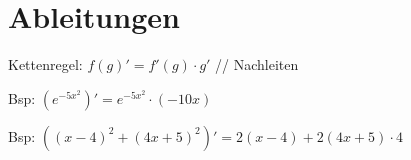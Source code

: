 
\usepackage{amsfonts}
\usepackage{pdfpages}



\newcommand{\Naeherung}{\textcolor{purple}{\textbf{Näherung}}}
\newcommand{\gray}[1]{\textcolor{lgr}{#1}}




\section*{Ableitungen}
Kettenregel: $f(g)' = f'(g) \cdot g'$ // Nachleiten 

Bsp: $(e^{-5x^2})' = e^{-5x^2} \cdot (-10x)$

Bsp: $((x-4)^2 +(4x+5)^2)' = 2(x-4) + 2(4x+5)\cdot4 $








